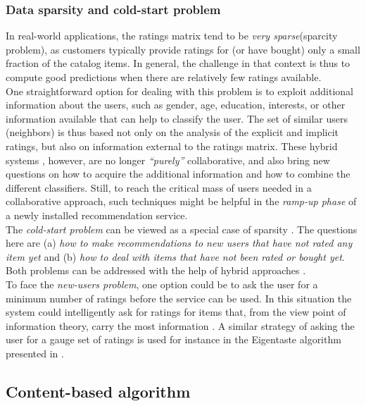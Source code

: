 \subsubsection{Data sparsity and cold-start problem}\label{coldstart}

In real-world applications, the ratings matrix tend to be \textit{very
sparse}(sparcity problem), as customers typically provide  ratings
for (or have bought) only a small fraction of the catalog items. In
general, the challenge in that context is thus to compute good
predictions when there are relatively few ratings available.\\ One
straightforward option for dealing with this problem is to exploit
additional information about the users, such as gender, age,
education, interests, or other information available that can help to
classify the user. The set of similar users (neighbors) is thus based
not only on the analysis of the explicit and implicit ratings, but
also on information external to the ratings matrix. These hybrid
systems  \cite{pazzani2007content}, however, are no longer
\textit{“purely”} collaborative, and also bring new questions on 
how to acquire the additional information and how to combine 
the different classifiers. Still, to reach the critical mass of users needed
in a collaborative approach, such techniques might be helpful in the
\textit{ramp-up phase} of a newly installed recommendation service. \\
The \textit{cold-start problem} can be viewed as a special case of
sparsity  \cite{huang2004applying}. The questions here are (a) \textit{how 
to make recommendations to new users that have not rated
any item yet} and (b) \textit{how to deal with items that have not
been rated or bought yet}. Both problems can be addressed with the
help of hybrid approaches  \cite{adomavicius2005toward}. \\To face the
\textit{new-users problem}, one option could be to ask the user for a
minimum number of ratings before the service can be used. In this
situation the system could intelligently ask for ratings for items
that, from the view point of information theory, carry the most
information  \cite{rashid2002getting}. A similar strategy of asking
the user for a gauge set of ratings is used for instance in the Eigentaste
algorithm presented in  \cite{goldberg2001eigentaste}.

\subsection{Content-based algorithm}

